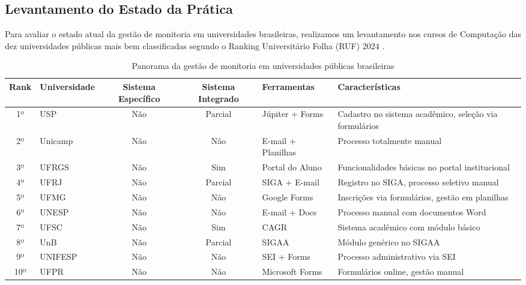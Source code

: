 \documentclass[portuguese]{sbc2025}%
\begin{document}
\subsection{Levantamento do Estado da Prática}

Para avaliar o estado atual da gestão de monitoria em universidades brasileiras, realizamos um levantamento nos cursos de Computação das dez universidades públicas mais bem classificadas segundo o Ranking Universitário Folha (RUF) 2024 \cite{folha2024ruf}.

\begin{table}[htb]
  \centering
  \caption{Panorama da gestão de monitoria em universidades públicas brasileiras}
  \label{tab:estado-pratica}
  \begin{adjustbox}{max width=\textwidth}
    \begin{tabular}{|c|l|c|c|p{3cm}|p{5cm}|}
      \hline
      \textbf{Rank} & \textbf{Universidade} & \textbf{Sistema Específico} & \textbf{Sistema Integrado} & \textbf{Ferramentas} & \textbf{Características} \\
      \hline
      1º & USP & Não & Parcial & Júpiter + Forms & Cadastro no sistema acadêmico, seleção via formulários \\
      \hline
      2º & Unicamp & Não & Não & E-mail + Planilhas & Processo totalmente manual \\
      \hline
      3º & UFRGS & Não & Sim & Portal do Aluno & Funcionalidades básicas no portal institucional \\
      \hline
      4º & UFRJ & Não & Parcial & SIGA + E-mail & Registro no SIGA, processo seletivo manual \\
      \hline
      5º & UFMG & Não & Não & Google Forms & Inscrições via formulários, gestão em planilhas \\
      \hline
      6º & UNESP & Não & Não & E-mail + Docs & Processo manual com documentos Word \\
      \hline
      7º & UFSC & Não & Sim & CAGR & Sistema acadêmico com módulo básico \\
      \hline
      8º & UnB & Não & Parcial & SIGAA & Módulo genérico no SIGAA \\
      \hline
      9º & UNIFESP & Não & Não & SEI + Forms & Processo administrativo via SEI \\
      \hline
      10º & UFPR & Não & Não & Microsoft Forms & Formulários online, gestão manual \\
      \hline
    \end{tabular}
  \end{adjustbox}
\end{table}
\end{document}
